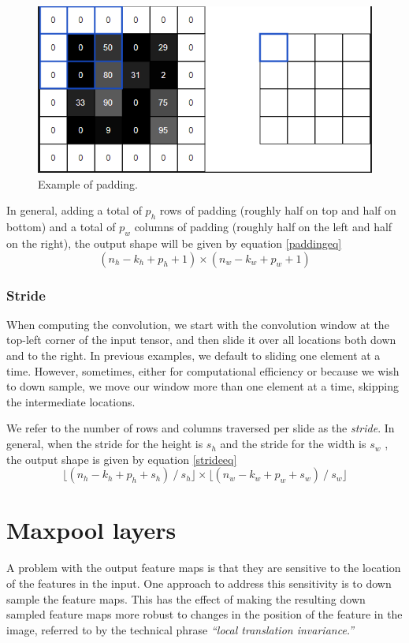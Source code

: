 \documentclass[11pt]{report}
\begin{document}
\begin{figure}[!h]
	\includegraphics[scale=0.5]{padding.png}
	\centering 
	\caption{Example of padding.}
	\label{paddingex}
\end{figure}
In general, adding a total of  $p_h$ rows of padding (roughly half on top and half on bottom) and a total of  $p_w$  columns of padding (roughly half on the left and half on the right), the output shape will be given by equation \ref{paddingeq}
\begin{equation} \label{paddingeq}
(n_h - k_h + p_h + 1) \times (n_w - k_w + p_w + 1)
\end{equation}

\subsubsection{Stride}
When computing the convolution, we start with the convolution window at the top-left corner of the input tensor, and then slide it over all locations both down and to the right. In previous examples, we default to sliding one element at a time. However, sometimes, either for computational efficiency or because we wish to down sample, we move our window more than one element at a time, skipping the intermediate locations.

We refer to the number of rows and columns traversed per slide as the \textit{stride}. In general, when the stride for the height is $s_h$ and the stride for the width is $s_w$ , the output shape is given by equation \ref{strideeq}
\begin{equation} \label{strideeq}
\lfloor (n_h - k_h + p_h + s_h)\ /\ s_h\rfloor \times \lfloor (n_w - k_w + p_w + s_w)\ /\ s_w \rfloor
\end{equation}


\section{Maxpool layers} \label{maxpool}
A problem with the output feature maps is that they are sensitive to the location of the features in the input. One approach to address this sensitivity is to down sample the feature maps. This has the effect of making the resulting down sampled feature maps more robust to changes in the position of the feature in the image, referred to by the technical phrase \textit{“local translation invariance.”}
\end{document}

